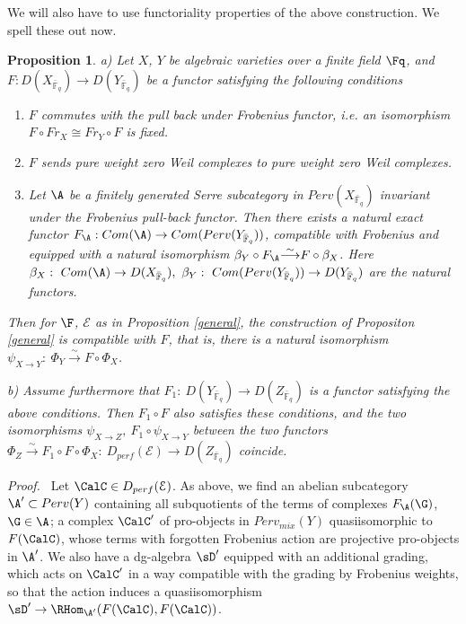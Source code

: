 \documentclass[11pt]{amsart}
\newtheorem{prop}{Proposition}
\theoremstyle{definition}
\theoremstyle{remark}
\theoremstyle{remark}
\newcommand{\iso}{{\stackrel{\sim}{\longrightarrow}}}
\newcommand{\<}{\langle}
\renewcommand{\>}{\rangle}
\newcommand{\Fqbar}{{\bar{\mathbb F}_q}}
\newcommand{\Epur}{{\mathcal E}}
\begin{document}
We will also have to use functoriality properties of the above 
construction. We spell these out now.

\begin{prop}\label{foon}
a) Let $X$, $Y$ be algebraic varieties over a finite field $\Fq$, and 
$F:D(X_{\Fqbar})
\to D(Y_{\Fqbar})$ be a functor
 satisfying the following conditions

\begin{enumerate} \item $F$ commutes with the pull back under Frobenius
functor, i.e. an isomorphism $F\circ Fr_X\cong Fr_Y \circ F$ is fixed.

\item \label{purprop}
 $F$ sends pure weight zero Weil complexes to pure weight zero Weil complexes.

\item \label{exaprop}
Let $\A$ be a finitely generated Serre subcategory in 
$Perv(X_{\Fqbar})$ invariant under the Frobenius pull-back functor.
 Then there exists a
natural exact functor $F_{\A}:Com(\A)\to Com(Perv(Y_{\Fqbar}))$,
compatible with Frobenius and equipped with a natural isomorphism
$\beta_Y\circ F_{\A}\iso F\circ\beta_X$. Here $\beta_X:\ Com(\A)\to
D(X_{\Fqbar}),\ \beta_Y:\ Com(Perv(Y_{\Fqbar}))\to D(Y_{\Fqbar})$ are
the natural functors.
\end{enumerate}

Then for $\F$, $\Epur$ as in Proposition \ref{general}, the construction of Propositon \ref{general}
 is compatible with
$F$, that is, there is a natural isomorphism $\psi_{X\to Y}:\ 
\Phi_Y\iso F\circ\Phi_X$.

b) Assume furthermore that  $ F_1:\ D(Y_{\Fqbar})\to D(Z_{\Fqbar})$  
 is a functor satisfying the above conditions. Then 
 $F_1\circ F$ also satisfies these conditions,
and the two isomorphisms $\psi_{X\to Z},\ F_1\circ\psi_{X\to Y}$ 
between the two functors 
$\Phi_Z\iso F_1\circ F\circ\Phi_X:\  
D_{perf}(\Epur)\to D(Z_{\Fqbar})$ coincide.

\end{prop}


{\em Proof.\ } Let $\CalC\in D_{perf}(\Epur)$.
As above, we find an abelian subcategory $\A'\subset Perv(Y)$ containing all subquotients of the terms of complexes
$F_{\A}(\G)$, $\G\in \A$;  a complex $\CalC'$ of pro-objects in $Perv_{mix}(Y)$ quasiisomorphic
to $F(\CalC)$, whose terms with forgotten Frobenius action are projective pro-objects
in $\A'$. We  also have a dg-algebra $\sD'$ equipped with an additional grading, which acts
on $\CalC'$ in a way compatible with the grading by Frobenius weights, so that the action
induces a quasiisomorphism $\sD'\to \RHom_{\A'}(F(\CalC),F(\CalC))$.
\end{document}
